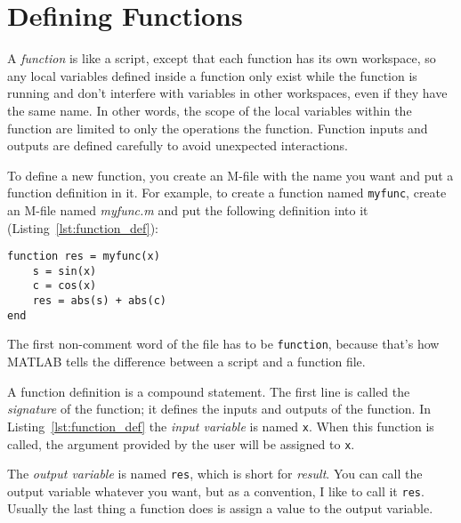 \section{Defining Functions}

A \emph{function} is like a script, except that each function has its own workspace, so any local variables defined
inside a function only exist while the function is running and don't
interfere with variables in other workspaces, even if they have the
same name.  In other words, the scope of the local variables within the function are limited to only the operations the function.
Function inputs and outputs are defined carefully to avoid
unexpected interactions.

To define a new function, you create an M-file with the name you
want and put a function definition in it.  For example, to create
a function named \lstinline{myfunc}, create an M-file named \emph{myfunc.m}
and put the following definition into it (Listing~\ref{lst:function_def}):


\begin{lstlisting}[caption={A function definition}, label={lst:function_def}]
function res = myfunc(x)
    s = sin(x)
    c = cos(x)
    res = abs(s) + abs(c)
end
\end{lstlisting}

The first non-comment word of the file has to be \lstinline{function}, because
that's how MATLAB tells the difference between a script and a function
file.


A function definition is a compound statement.  The first line
is called the \emph{signature} of the function; it defines
the inputs and outputs of the function.  In Listing~\ref{lst:function_def} the \emph{input variable} is named \lstinline{x}.  When this function is called, the
argument provided by the user will be assigned to \lstinline{x}.



The \emph{output variable} is named \lstinline{res}, which is short for
\emph{result}.  You can call the output variable whatever you want, but
as a convention, I like to call it \lstinline{res}.  Usually the last
thing a function does is assign a value to the output \mbox{variable}.

